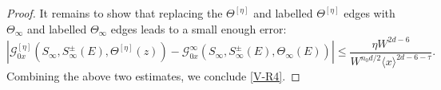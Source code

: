 \documentclass{article}
\newcommand{\1}{\mathds{1}}
\numberwithin{equation}{section}
\newcommand{\be}{\begin{equation}}
\newcommand{\ee}{\end{equation}}
\renewcommand{\cal}{\mathcal}
\newcommand{\ii}{\mathrm{i}} %
\renewcommand{\leq}{\leqslant}
\renewcommand{\le}{\leq}
\newcommand{\Z}{\mathbb{Z}}
\DeclareMathOperator{\OO}{O}
\theoremstyle{plain} %
\theoremstyle{remark}
\newcommand{\Sdelta}{{\Sigma}_T}
\newcommand{\wtSdelta}{\Sigma}
\newcommand{\Selekl}{{\mathcal E}^{[\eta]}}
\begin{document}
\begin{proof}
It remains to show that replacing the $\Theta^{[\eta]}$ and labelled $\Theta^{[\eta]}$ edges with  $\Theta_{\infty}$ and labelled $\Theta_{\infty}$ edges leads to a small enough error:
 \be\label{V-R3.5}
 \left|{\cal G}^{[\eta]}_{0x}(S_\infty, S^{\pm}_\infty(E),\Theta^{[\eta]}(z))-{\cal G}^\infty_{0x}( S_\infty,  S^{\pm}_\infty(E),\Theta_\infty (E))\right| \le  \frac{\eta W^{2d-6}}{W^{n_0d/2}\langle x\rangle^{2d-6-\tau}}.
 \ee
 Combining the above two estimates, we conclude \eqref{V-R4}. %
 


\end{proof}
\end{document}
